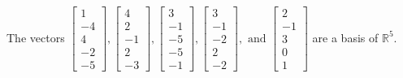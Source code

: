 \begin{exercise}
\begin{exerciseStatement}
  \end{exerciseStatement}
  \begin{exerciseAnswer}
   The vectors \(\left[\begin{array}{r}
1 \\
-4 \\
4 \\
-2 \\
-5
\end{array}\right] , \left[\begin{array}{r}
4 \\
2 \\
-1 \\
2 \\
-3
\end{array}\right] , \left[\begin{array}{r}
3 \\
-1 \\
-5 \\
-5 \\
-1
\end{array}\right] , \left[\begin{array}{r}
3 \\
-1 \\
-2 \\
2 \\
-2
\end{array}\right] , \text{ and } \left[\begin{array}{r}
2 \\
-1 \\
3 \\
0 \\
1
\end{array}\right]\) 
  	 are  a basis of \(\mathbb{R}^5\).
  


  \end{exerciseAnswer}
\end{exercise}